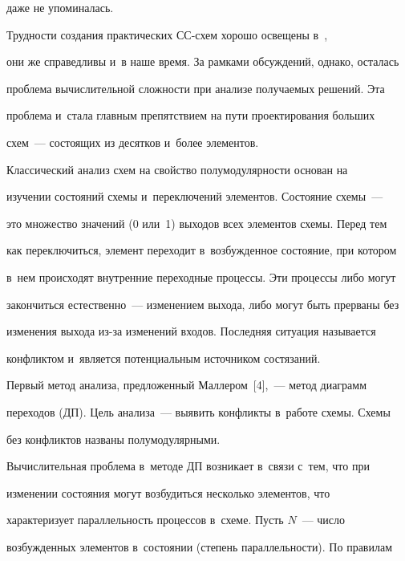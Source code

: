 даже не упоминалась.


   


   Трудности создания практических СС-схем хорошо освещены в~\cite{1-pl}, 


они же справедливы и~в наше время. За рамками обсуждений, однако, осталась 


проблема вычислительной сложности при анализе получаемых решений. Эта 


проблема и~стала главным препятствием на пути проектирования больших 


схем~--- состоящих из десятков и~более элементов.


   


   Классический анализ схем на свойство полумодулярности основан на 


изуче\-нии состояний схемы и~переключений элементов. Состояние схемы~--- 


это множество значений (0 или~1) выходов всех элементов схемы. Перед тем 


как переключиться, элемент переходит в~возбужденное состояние, при котором 


в~нем происходят внутренние переходные процессы. Эти процессы либо могут 


закончиться естественно~--- изменением выхода, либо могут быть прерваны без 


изменения выхода из-за изменений входов. Последняя ситуация называется 


конфликтом и~является потенциальным источником состязаний.


   


   Первый метод анализа, предложенный Маллером~[4],~--- метод диаграмм 


переходов (ДП). Цель анализа~--- выявить конфликты в~работе схемы. Схемы 


без конфликтов названы полумодулярными.


   


   Вычислительная проблема в~методе ДП возникает в~связи с~тем, что при 


изменении состояния могут возбудиться несколько элементов, что 


характеризует параллельность процессов в~схеме. Пусть $N$~--- число 


возбужденных элементов в~состоянии (степень параллельности). По правилам 


